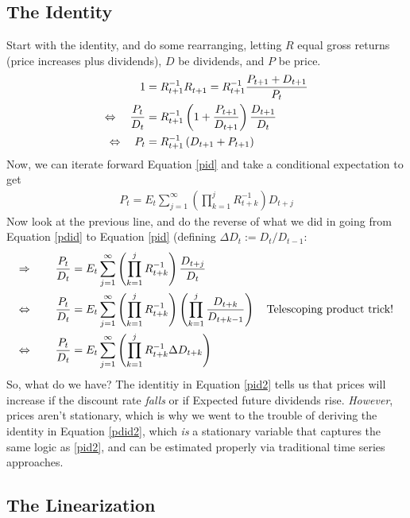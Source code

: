 \documentclass[a4paper,12pt]{scrartcl}
\begin{document}
\subsection{The Identity}

Start with the identity, and do some rearranging, letting $R$ equal
gross returns (price increases plus dividends), $D$ be dividends,
and $P$ be price.
\begin{align}
    1 &= R^{-1}_{t+1} R^{}_{t+1} = R^{-1}_{t+1} \frac{P_{t+1} + D_{t+1}}{P_t} \notag \\
    \Leftrightarrow \quad \frac{P_t}{D_t} &=
	R^{-1}_{t+1} \left( 1 + \frac{P_{t+1}}{D_{t+1}}\right) \frac{D_{t+1}}{D_t}
	\label{pdid} \\
    \Leftrightarrow \quad {P_t} &=
	R^{-1}_{t+1} \left( {D_{t+1}} + {P_{t+1}}\right)
	\label{pid}
\end{align}
Now, we can iterate forward Equation \ref{pid} and take a conditional
expectation to get
\begin{align}
    \label{pid2}
    P_t = E_t \sum^\infty_{j=1} \left(\prod^j_{k=1} R^{-1}_{t+k} \right)
	D_{t+j}
\end{align}
Now look at the previous line, and do the reverse of what we did
in going from Equation \ref{pdid} to Equation \ref{pid} (defining
$\Delta D_t := D_t / D_{t-1}$:
\begin{align}
    \Rightarrow \qquad \frac{P_t}{D_t} &= E_t \sum^\infty_{j=1}
	\left(\prod^j_{k=1} R^{-1}_{t+k} \right)  \frac{D_{t+j}}{D_t}
	\notag \\
    \Leftrightarrow \qquad \frac{P_t}{D_t} &= E_t \sum^\infty_{j=1}
	\left(\prod^j_{k=1} R^{-1}_{t+k} \right)
	\left(\prod^{j}_{k=1} \frac{D_{t+k}}{D_{t+k-1}}\right) \quad
	\text{Telescoping product trick!} \notag \\
    \Leftrightarrow \qquad \frac{P_t}{D_t} &= E_t \sum^\infty_{j=1}
	\left(\prod^j_{k=1} R^{-1}_{t+k} \Delta D_{t+k} \right)
	\label{pdid2}
\end{align}
So, what do we have? The identitiy in Equation \ref{pid2} tells us that
prices will increase if the discount rate \emph{falls} or if Expected
future dividends rise.  \emph{However}, prices aren't stationary, which
is why we went to the trouble of deriving the identity in
Equation \ref{pdid2}, which \emph{is} a stationary variable that
captures the same logic as \ref{pid2}, and can be estimated properly
via traditional time series approaches.


\subsection{The Linearization}
\end{document}
